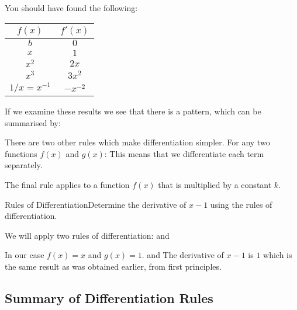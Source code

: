 You should have found the following:

\begin{center}
\begin{tabular}{|c|c|}\hline
$f(x)$&$f'(x)$\\\hline\hline
$b$&$0$\\\hline
$x$&$1$\\\hline
$x^2$&$2x$\\\hline
$x^3$&$3x^2$\\\hline
$1/x=x^{-1}$&$-x^{-2}$\\\hline
\end{tabular}
\end{center}

If we examine these results we see that there is a pattern, which can be summarised by:

There are two other rules which make differentiation simpler. For any two functions $f(x)$ and $g(x)$:
This means that we differentiate each term separately. 

The final rule applies to a function $f(x)$ that is multiplied by a constant $k$.

\pagebreak
\begin{wex}{Rules of Differentiation}{Determine the derivative of $x-1$ using the rules of differentiation.}{
We will apply two rules of differentiation:
and

In our case $f(x)=x$ and $g(x)=1$.
and
The derivative of $x-1$ is $1$ which is the same result as was obtained earlier, from first principles.
}
\end{wex}

\subsection{Summary of Differentiation Rules}
\label{md:summ}

